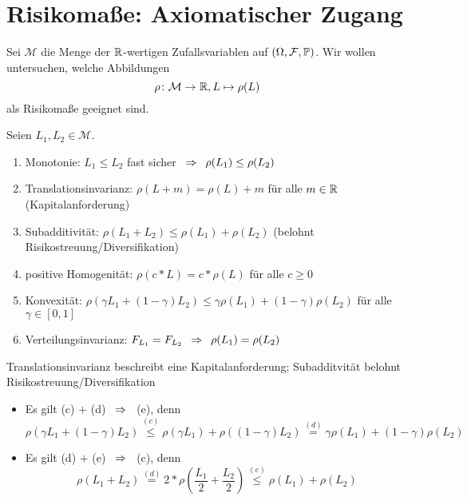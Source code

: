 \section{Risikomaße: Axiomatischer Zugang}

Sei $\mathcal{M}$ die Menge der $\mathbb{R}$-wertigen Zufallsvariablen auf $(\Omega, \mathcal{F}, \mathbb{P})$. Wir wollen untersuchen, welche Abbildungen 
\begin{equation*}
\abb{\rho}{\mathcal{M}}{\R}, L \mapsto \rho(L)
\end{equation*}
als Risikomaße geeignet sind.

\begin{*definition}
	Seien $L_1, L_2 \in \mathcal{M}$.
	\begin{enumerate}[label=(\alph*), nolistsep]
		\item Monotonie: $L_1 \le L_2$ fast sicher $\enskip \Rightarrow \enskip \rho(L_1) \le \rho(L_2)$
		\item Translationsinvarianz: $\rho(L + m) = \rho(L) + m$ für alle $m \in \mathbb{R}$ (Kapitalanforderung)
		\item Subadditivität: $\rho(L_1 + L_2) \le \rho(L_1) + \rho(L_2)$ (belohnt Risikostreuung/Diversifikation)
		\item positive Homogenität: $\rho(c * L) = c * \rho(L)$ für alle $c \ge 0$
		\item Konvexität: $\rho(\gamma L_1 + (1-\gamma) L_2) \le \gamma \rho(L_1) + (1-\gamma) \rho(L_2)$ für alle $\gamma \in [0,1]$
		\item Verteilungsinvarianz: $F_{L_1} = F_{L_2} \enskip \Rightarrow \enskip \rho(L_1) = \rho(L_2)$
	\end{enumerate}
\end{*definition}

\begin{*bemerkung_inline}
	Translationsinvarianz beschreibt eine Kapitalanforderung; Subadditvität belohnt Risikostreuung/Diversifikation
	\begin{itemize}[nolistsep]
		\item Es gilt (c) $+$ (d) $\enskip \Rightarrow \enskip$ (e), denn
		\begin{equation*}
		\rho(\gamma L_1 + (1-\gamma) L_2) \overset{(c)}{\le} \rho(\gamma L_1) + \rho((1-\gamma) L_2) \overset{(d)}{=} \gamma \rho(L_1) + (1-\gamma) \rho(L_2)
		\end{equation*}
		\item Es gilt (d) $+$ (e) $\enskip \Rightarrow \enskip$ (c), denn
		\begin{equation*}
		\rho(L_1 + L_2) \overset{(d)}{=} 2 * \rho(\frac{L_1}{2} + \frac{L_2}{2}) \overset{(e)}{\le} \rho(L_1) + \rho(L_2)
		\end{equation*}
	\end{itemize}
\end{*bemerkung_inline}

